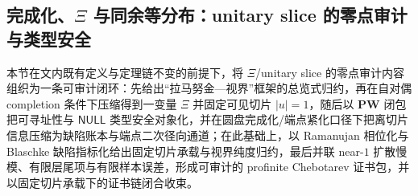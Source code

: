 \subsection{完成化、\texorpdfstring{$\Xi$}{Xi} 与同余等分布：unitary slice 的零点审计与类型安全}\label{subsec:xi-completion-audit}
本节在文内既有定义与定理链不变的前提下，将 \(\Xi\)/unitary slice 的零点审计内容组织为一条可审计闭环：先给出“拉马努金—视界”框架的总览式归约，再在自对偶 completion 条件下压缩得到一变量 \(\Xi\) 并固定可见切片 \(|u|=1\)，随后以 \(\mathbf{PW}\) 闭包把可寻址性与 \(\mathsf{NULL}\) 类型安全对象化，并在圆盘完成化/端点紧化口径下把离切片信息压缩为缺陷账本与端点二次径向通道；在此基础上，以 Ramanujan 相位化与 Blaschke 缺陷指标化给出固定切片承载与视界纯度归约，最后并联 near-\(1\) 扩散慢模、有限层尾项与有限样本误差，形成可审计的 profinite Chebotarev 证书包，并以固定切片承载下的证书链闭合收束。


















